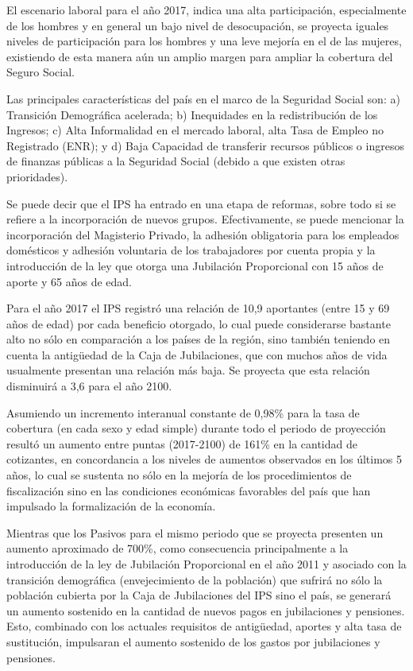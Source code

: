 \documentclass[a4paper,11pt]{article}
\begin{document}
El escenario laboral para el año 2017, indica una alta participación, especialmente de los hombres y en general un bajo nivel de desocupación, se proyecta iguales niveles de participación para los hombres y una leve mejoría en el de las mujeres, existiendo de esta manera aún un amplio margen para ampliar la cobertura del Seguro Social.

Las principales características del país en el marco de la Seguridad Social son: a) Transición Demográfica acelerada; b) Inequidades en la redistribución de los Ingresos; c) Alta Informalidad en el mercado laboral, alta Tasa de Empleo no Registrado (ENR); y d) Baja Capacidad de transferir recursos públicos o ingresos de finanzas públicas a la Seguridad Social (debido a que existen otras prioridades).

Se puede decir que el IPS ha entrado en una etapa de reformas, sobre todo si se refiere a la incorporación de nuevos grupos. Efectivamente, se puede mencionar la incorporación del Magisterio Privado, la adhesión obligatoria para los empleados domésticos y adhesión voluntaria de los trabajadores por cuenta propia y la introducción de la ley que otorga una Jubilación Proporcional con 15 años de aporte y 65 años de edad.

Para el año 2017 el IPS registró una relación de 10,9 aportantes (entre 15 y 69 años de edad) por cada beneficio otorgado, lo cual puede considerarse bastante alto no sólo en comparación a los países de la región, sino también teniendo en cuenta la antigüedad de la Caja de Jubilaciones, que con muchos años de vida usualmente presentan una relación más baja. Se proyecta que esta relación disminuirá a 3,6 para el año 2100.

Asumiendo un incremento interanual constante de 0,98\% para la tasa de cobertura (en cada sexo y edad simple) durante todo el periodo de proyección resultó un aumento entre puntas (2017-2100) de 161\% en la cantidad de cotizantes, en concordancia a los niveles de aumentos observados en los últimos 5 años, lo cual se sustenta no sólo en la mejoría de los procedimientos de fiscalización sino en las condiciones económicas favorables del país que han impulsado la formalización de la economía.

Mientras que los Pasivos para el mismo periodo que se proyecta presenten un aumento aproximado de 700\%, como consecuencia principalmente a la introducción de la ley de Jubilación Proporcional en el año 2011 y asociado con la transición demográfica (envejecimiento de la población) que sufrirá no sólo la población cubierta por la Caja de Jubilaciones del IPS sino el país, se generará un aumento sostenido en la cantidad de nuevos pagos en jubilaciones y pensiones.  Esto, combinado con los actuales requisitos de antigüedad, aportes y alta tasa de sustitución, impulsaran el aumento sostenido de los gastos por jubilaciones y pensiones.
\end{document}
